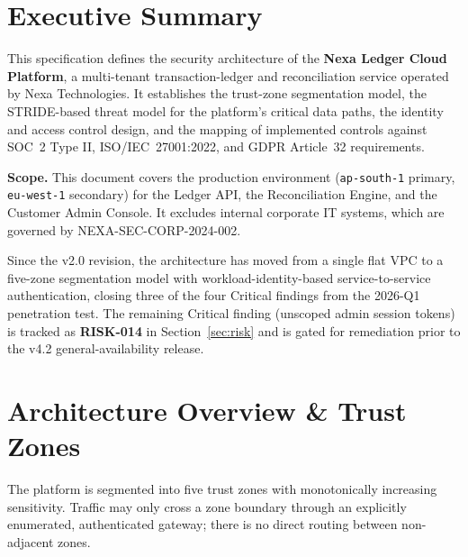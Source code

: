 \documentclass[11pt,a4paper,parskip=half]{scrreprt}
\begin{document}
\section{Executive Summary}

This specification defines the security architecture of the \textbf{Nexa Ledger Cloud Platform}, a
multi-tenant transaction-ledger and reconciliation service operated by Nexa Technologies. It
establishes the trust-zone segmentation model, the STRIDE-based threat model for the platform's
critical data paths, the identity and access control design, and the mapping of implemented
controls against SOC~2 Type II, ISO/IEC~27001:2022, and GDPR Article~32 requirements.

\begin{infobox}
\textbf{\color{navy}Scope.} This document covers the production environment (\texttt{ap-south-1}
primary, \texttt{eu-west-1} secondary) for the Ledger API, the Reconciliation Engine, and the
Customer Admin Console. It excludes internal corporate IT systems, which are governed by
NEXA-SEC-CORP-2024-002.
\end{infobox}

Since the v2.0 revision, the architecture has moved from a single flat VPC to a five-zone
segmentation model with workload-identity-based service-to-service authentication, closing three
of the four Critical findings from the 2026-Q1 penetration test. The remaining Critical finding
(unscoped admin session tokens) is tracked as \textbf{RISK-014} in Section~\ref{sec:risk} and is
gated for remediation prior to the v4.2 general-availability release.

\section{Architecture Overview \& Trust Zones}
\label{sec:arch}

The platform is segmented into five trust zones with monotonically increasing sensitivity.
Traffic may only cross a zone boundary through an explicitly enumerated, authenticated gateway;
there is no direct routing between non-adjacent zones.
\end{document}
